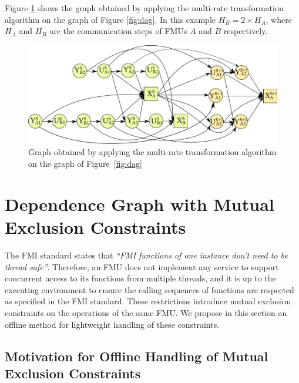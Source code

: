 Figure \ref{fig:dagmr} shows the graph obtained by applying the multi-rate transformation algorithm on the graph of Figure \ref{fig:dag}. In this example $H_B = 2 \times H_A$, where $H_A$ and $H_B$ are the communication steps of FMUs $A$ and $B$ respectively.

\begin{figure}[htb]
\centering
  \includegraphics[scale=0.5]{figures/Operation_Graph_Two_Models_Multirate}
\caption{Graph obtained by applying the multi-rate transformation algorithm on the graph of Figure~\ref{fig:dag}}
\label{fig:dagmr}
\end{figure}

\section{Dependence Graph with Mutual Exclusion Constraints}
The FMI standard states that \textit{``FMI functions of one instance don't need to be thread safe''}. Therefore, an FMU does not implement any service to support concurrent access to its functions from multiple threads, and it is up to the executing environment to ensure the calling sequences of functions are respected as specified in the FMI standard. These restrictions introduce mutual exclusion constraints on the operations of the same FMU. We propose in this section an offline method for lightweight handling of these constraints.

\subsection{Motivation for Offline Handling of Mutual Exclusion Constraints}

